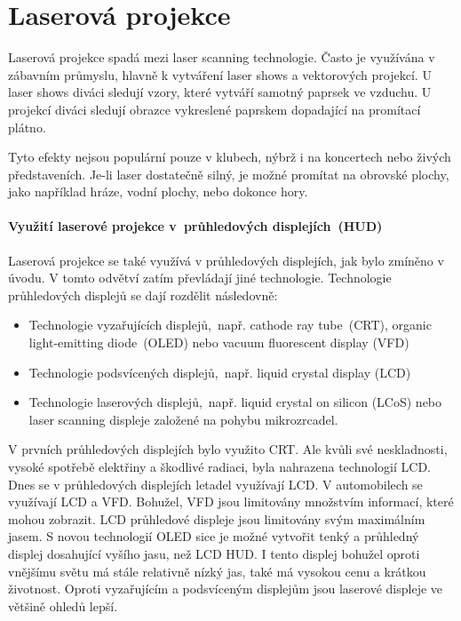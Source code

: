 \chapter{Laserová projekce~\cite{laser-projection}}
Laserová projekce spadá mezi laser scanning technologie. Často je využívána v zábavním průmyslu, hlavně k vytváření laser shows a vektorových projekcí. U laser shows diváci sledují vzory, které vytváří samotný paprsek ve vzduchu. U projekcí diváci sledují obrazce vykreslené paprskem dopadající na promítací plátno.

Tyto efekty nejsou populární pouze v klubech, nýbrž i na koncertech nebo živých představeních. Je-li laser dostatečně silný, je možné promítat na obrovské plochy, jako například hráze, vodní plochy, nebo dokonce hory.

\subsubsection{Využití laserové projekce v~průhledových displejích~(HUD)~\cite{laser-huds}\cite{dev-of-laser-huds-in-driving}}
Laserová projekce se také využívá v průhledových displejích, jak bylo zmíněno v úvodu. V tomto odvětví zatím převládají jiné technologie. Technologie průhledových displejů se dají rozdělit následovně:

\begin{itemize}
  \item Technologie vyzařujících displejů,~např. cathode ray tube~(CRT), organic light-emitting diode~(OLED) nebo vacuum fluorescent display (VFD)
  \item Technologie podsvícených displejů,~např. liquid crystal display (LCD)
  \item Technologie laserových displejů,~např. liquid crystal on silicon (LCoS) nebo laser scanning displeje založené na pohybu mikrozrcadel.
\end{itemize}

V prvních průhledových displejích bylo využito CRT. Ale kvůli své neskladnosti, vysoké spotřebě elektřiny a škodlivé radiaci, byla nahrazena technologií LCD. Dnes se v průhledových displejích letadel využívají LCD. V automobilech se využívají LCD a VFD.
Bohužel, VFD jsou limitovány množstvím informací, které mohou zobrazit. LCD průhledové displeje jsou limitovány svým maximálním jasem.
S novou technologií OLED sice je možné vytvořit tenký a průhledný displej dosahující vyšího jasu, než LCD HUD.
I tento displej bohužel oproti vnějšímu světu má stále relativně nízký jas, také má vysokou cenu a krátkou životnost.
Oproti vyzařujícím a podsvíceným displejům jsou laserové displeje ve většině ohledů lepší. 

